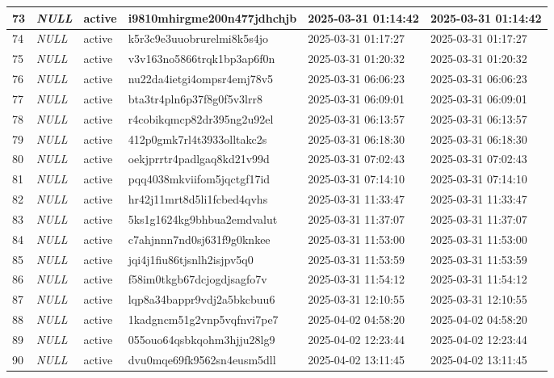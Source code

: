 \begin{longtable}{|l|l|l|l|l|l|}
73 & \textit{NULL} & active & i9810mhirgme200n477jdhchjb & 2025-03-31 01:14:42 & 2025-03-31 01:14:42 \\ \hline 
74 & \textit{NULL} & active & k5r3c9e3uuobrurelmi8k5s4jo & 2025-03-31 01:17:27 & 2025-03-31 01:17:27 \\ \hline 
75 & \textit{NULL} & active & v3v163no5866trqk1bp3ap6f0n & 2025-03-31 01:20:32 & 2025-03-31 01:20:32 \\ \hline 
76 & \textit{NULL} & active & nu22da4ietgi4ompsr4emj78v5 & 2025-03-31 06:06:23 & 2025-03-31 06:06:23 \\ \hline 
77 & \textit{NULL} & active & bta3tr4pln6p37f8g0f5v3lrr8 & 2025-03-31 06:09:01 & 2025-03-31 06:09:01 \\ \hline 
78 & \textit{NULL} & active & r4cobikqmcp82dr395ng2u92el & 2025-03-31 06:13:57 & 2025-03-31 06:13:57 \\ \hline 
79 & \textit{NULL} & active & 412p0gmk7rl4t3933olltakc2s & 2025-03-31 06:18:30 & 2025-03-31 06:18:30 \\ \hline 
80 & \textit{NULL} & active & oekjprrtr4padlgaq8kd21v99d & 2025-03-31 07:02:43 & 2025-03-31 07:02:43 \\ \hline 
81 & \textit{NULL} & active & pqq4038mkviifom5jqctgf17id & 2025-03-31 07:14:10 & 2025-03-31 07:14:10 \\ \hline 
82 & \textit{NULL} & active & hr42j11mrt8d5li1fcbed4qvhs & 2025-03-31 11:33:47 & 2025-03-31 11:33:47 \\ \hline 
83 & \textit{NULL} & active & 5ks1g1624kg9bhbua2emdvalut & 2025-03-31 11:37:07 & 2025-03-31 11:37:07 \\ \hline 
84 & \textit{NULL} & active & c7ahjnnn7nd0sj631f9g0knkee & 2025-03-31 11:53:00 & 2025-03-31 11:53:00 \\ \hline 
85 & \textit{NULL} & active & jqi4j1fiu86tjsnlh2isjpv5q0 & 2025-03-31 11:53:59 & 2025-03-31 11:53:59 \\ \hline 
86 & \textit{NULL} & active & f58im0tkgb67dcjogdjsagfo7v & 2025-03-31 11:54:12 & 2025-03-31 11:54:12 \\ \hline 
87 & \textit{NULL} & active & lqp8a34bappr9vdj2a5bkcbuu6 & 2025-03-31 12:10:55 & 2025-03-31 12:10:55 \\ \hline 
88 & \textit{NULL} & active & 1kadgncm51g2vnp5vqfnvi7pe7 & 2025-04-02 04:58:20 & 2025-04-02 04:58:20 \\ \hline 
89 & \textit{NULL} & active & 055ouo64qsbkqohm3hjju28lg9 & 2025-04-02 12:23:44 & 2025-04-02 12:23:44 \\ \hline 
90 & \textit{NULL} & active & dvu0mqe69fk9562sn4eusm5dll & 2025-04-02 13:11:45 & 2025-04-02 13:11:45 \\ \hline 

\end{longtable}
